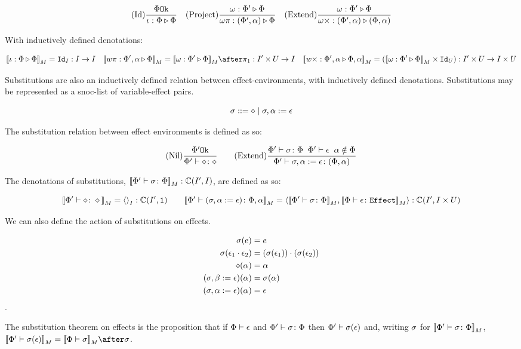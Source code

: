 \documentclass{Report}
\begin{document}
\[
    (\text{Id}) \frac{\Phi \texttt{Ok}}{\iota : \Phi \triangleright \Phi}
    \quad
    (\text{Project}) \frac{\omega : \Phi' \triangleright \Phi}{\omega\pi : (\Phi', \alpha) \triangleright \Phi}
    \quad
    (\text{Extend}) \frac{\omega : \Phi' \triangleright \Phi}{\omega\times : (\Phi', \alpha) \triangleright (\Phi, \alpha)}
\]

With inductively defined denotations: 

\[
    \deno{\wrel{\i}{\P}{\P}} = \Id{I}: I \rightarrow I
    \quad
    \deno{\wrel{w\pi}{\P',\a}{\P}} = \deno{\wrelw{\P'}{\P}}\after \p: I'\times U\rightarrow I
    \quad
    \deno{\wrel{w\x}{\P',\a}{\P,\a}} = (\deno{\wrelw{\P'}{\P}}\times \Id{U}): I'\times U\rightarrow I\times U
\]

Substitutions are also an inductively defined relation between effect-environments, with inductively defined denotations. Substitutions may be represented as a snoc-list of variable-effect pairs.

\[
    \sigma ::= \diamond \mid \sigma, \alpha := \epsilon    
\]

The substitution relation between effect environments is defined as so:

\[
    (\text{Nil}) \frac{\Phi' \texttt{Ok}}{\Phi' \vdash \diamond \colon \diamond}
    \quad\quad
    (\text{Extend}) \frac{\Phi' \vdash \sigma \colon \Phi\;\;\Phi'\vdash \epsilon\;\;\alpha\notin\Phi}{\Phi' \vdash \sigma, \alpha :=\epsilon \colon (\Phi, \alpha)}
\]

The denotations of substitutions, ${\bf [\![}\Phi' \vdash \sigma \colon \Phi{\bf ]\!]}_M: \mathbb{C}(I', I)$, are defined as so:

\[
    \deno{\typerelation{\P'}{\nil}{\nil}} = \term{I}: \C(I', \1)
    \quad\quad
    \deno{\typerelation{\P'}{(\si, \a\setto\e)}{\P,\a}} = \pr{\deno{\typerelation{\P'}{\si}{\P}}}{\deno{\typerelation{\P}{\e}{\effect}}}: \C(I', I\times U)
\]

We can also define the action of substitutions on effects.

\begin{align}
    \sigma(e) & = e \\
    \sigma(\epsilon_1\cdot\epsilon_2) & = (\sigma(\epsilon_1))\cdot(\sigma(\epsilon_2))\\
    \diamond(\alpha) & = \alpha\\
    (\sigma, \beta:= \epsilon)(\alpha) & = \sigma(\alpha) \\
    (\sigma, \alpha:= \epsilon)(\alpha) & =\epsilon
\end{align}.

The substitution theorem on effects is the proposition that if $\Phi\vdash \epsilon$ and $\Phi' \vdash \sigma \colon \Phi$ then $\Phi'\vdash \sigma(\epsilon)$ and, writing $\sigma$ for ${\bf [\![}\Phi' \vdash \sigma \colon \Phi{\bf ]\!]}_M$,  $\deno{\wellformed{\P'}{\si(\e)}} = \deno{\wellformed{\P}{\si}}\after\si$. 
\end{document}
